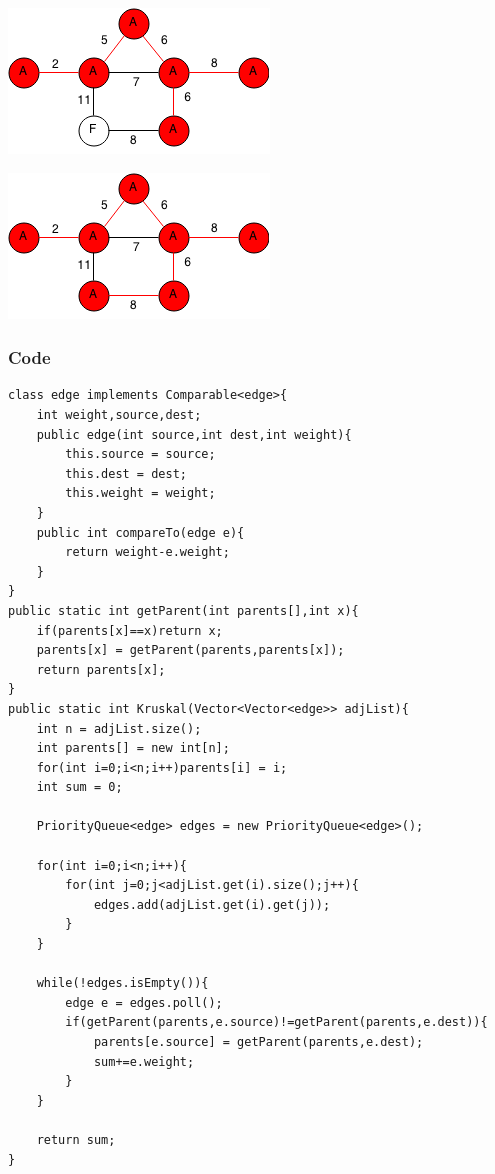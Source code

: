 \documentclass[11pt,oneside]{book}
\makeatletter
\def\maxwidth#1{\ifdim\Gin@nat@width>#1 #1\else\Gin@nat@width\fi}
\makeatother
\begin{document}
\vspace{5px}\includegraphics[width=\maxwidth{\textwidth}]{kruskal6.png}

\vspace{5px}\includegraphics[width=\maxwidth{\textwidth}]{kruskal7.png}

\subsubsection{Code}

\begin{lstlisting}
class edge implements Comparable<edge>{
    int weight,source,dest;
    public edge(int source,int dest,int weight){
        this.source = source;
        this.dest = dest;
        this.weight = weight;
    }
    public int compareTo(edge e){
        return weight-e.weight;
    }
}
public static int getParent(int parents[],int x){
    if(parents[x]==x)return x;
    parents[x] = getParent(parents,parents[x]);
    return parents[x];
}
public static int Kruskal(Vector<Vector<edge>> adjList){
    int n = adjList.size();
    int parents[] = new int[n];
    for(int i=0;i<n;i++)parents[i] = i;
    int sum = 0;
    
    PriorityQueue<edge> edges = new PriorityQueue<edge>();
    
    for(int i=0;i<n;i++){
        for(int j=0;j<adjList.get(i).size();j++){
            edges.add(adjList.get(i).get(j));
        }
    }
    
    while(!edges.isEmpty()){
        edge e = edges.poll();
        if(getParent(parents,e.source)!=getParent(parents,e.dest)){
            parents[e.source] = getParent(parents,e.dest);
            sum+=e.weight;
        }
    }
    
    return sum;
}
\end{lstlisting}
\end{document}
